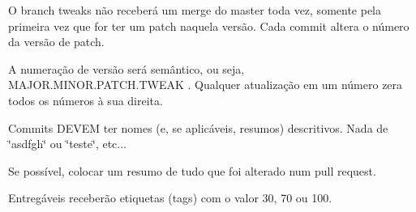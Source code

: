 \begin{DoxyItemize}
\item O branch tweaks não receberá um merge do master toda vez, somente pela primeira vez que for ter um patch naquela versão. Cada commit altera o número da versão de patch.
\item A numeração de versão será semântico, ou seja, M\+A\+J\+O\+R.\+M\+I\+N\+O\+R.\+P\+A\+T\+C\+H.\+T\+W\+E\+A\+K . Qualquer atualização em um número zera todos os números à sua direita.
\item Commits D\+E\+V\+E\+M ter nomes (e, se aplicáveis, resumos) descritivos. Nada de \char`\"{}asdfgh\char`\"{} ou \char`\"{}teste\char`\"{}, etc...
\item Se possível, colocar um resumo de tudo que foi alterado num pull request.
\item Entregáveis receberão etiquetas (tags) com o valor 30, 70 ou 100. 
\end{DoxyItemize}